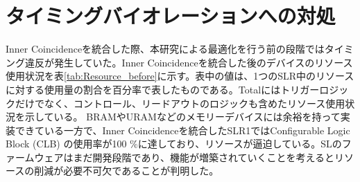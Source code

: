 
\clearpage
\section{タイミングバイオレーションへの対処}
\label{sec:appendix:timing_violation}
Inner Coincidenceを統合した際、本研究による最適化を行う前の段階ではタイミング違反が発生していた。Inner Coincidenceを統合した後のデバイスのリソース使用状況を表\ref{tab:Resource_before}に示す。表中の値は、1つのSLR中のリソースに対する使用量の割合を百分率で表したものである。Totalにはトリガーロジックだけでなく、コントロール、リードアウトのロジックも含めたリソース使用状況を示している。
BRAMやURAMなどのメモリーデバイスには余裕を持って実装できている一方で、Inner Coincidenceを統合したSLR1ではConfigurable Logic Block (CLB) の使用率が100 \%に達しており、リソースが逼迫している。SLのファームウェアはまだ開発段階であり、機能が増築されていくことを考えるとリソースの削減が必要不可欠であることが判明した。
